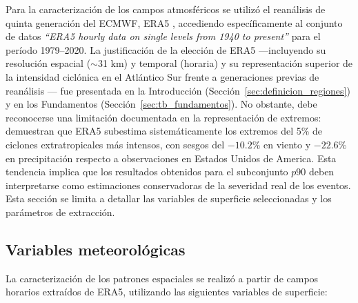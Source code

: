 Para la caracterización de los campos atmosféricos se utilizó el reanálisis de quinta generación del ECMWF, ERA5 \citep{hersbach2020era5}, accediendo específicamente al conjunto de datos \textit{``ERA5 hourly data on single levels from 1940 to present''} \citep{hersbach_era5_2023b} para el período 1979--2020. La justificación de la elección de ERA5 ---incluyendo su resolución espacial ($\sim$31 km) y temporal (horaria) y su representación superior de la intensidad ciclónica en el Atlántico Sur frente a generaciones previas de reanálisis \citep{gramcianinov2020analysis}--- fue presentada en la Introducción (Sección~\ref{sec:definicion_regiones}) y en los Fundamentos (Sección~\ref{sec:tb_fundamentos}). No obstante, debe reconocerse una limitación documentada en la representación de extremos: \citet{chen2024evaluation} demuestran que ERA5 subestima sistemáticamente los extremos del 5\% de ciclones extratropicales más intensos, con sesgos del $-10.2\%$ en viento y $-22.6\%$ en precipitación respecto a observaciones en Estados Unidos de America. Esta tendencia implica que los resultados obtenidos para el subconjunto $p90$ deben interpretarse como estimaciones conservadoras de la severidad real de los eventos. Esta sección se limita a detallar las variables de superficie seleccionadas y los parámetros de extracción.


\subsection{Variables meteorológicas}\label{subsec:variables}

La caracterización de los patrones espaciales se realizó a partir de campos horarios extraídos de ERA5, utilizando las siguientes variables de superficie:


